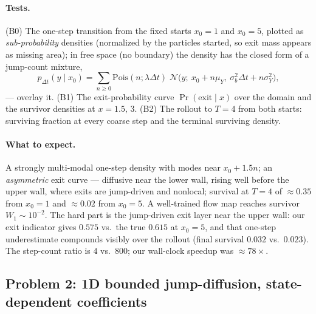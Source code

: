 \documentclass[11pt]{article}
\begin{document}
\paragraph{Tests.} (B0) The one-step transition from the fixed starts
$x_0=1$ and $x_0=5$, plotted as \emph{sub-probability} densities
(normalized by the particles started, so exit mass appears as missing
area); in free space (no boundary) the density has the closed form of a
jump-count mixture,
\begin{equation*}
p_{\Delta t}(y\mid x_0)=\sum_{n\ge0}\mathrm{Pois}(n;\lambda\Delta t)\;
\mathcal N\!\bigl(y;\ x_0+n\mu_Y,\ \sigma_b^2\Delta t+n\sigma_Y^2\bigr),
\end{equation*}
--- overlay it. (B1) The exit-probability curve
$\Pr(\text{exit}\mid x)$ over the domain and the survivor densities at
$x=1.5,\,3$. (B2) The rollout to $T=4$ from both starts: surviving
fraction at every coarse step and the terminal surviving density.

\paragraph{What to expect.} A strongly multi-modal one-step density with
modes near $x_0+1.5n$; an \emph{asymmetric} exit curve --- diffusive near
the lower wall, rising well before the upper wall, where exits are
jump-driven and nonlocal; survival at $T=4$ of $\approx0.35$ from $x_0=1$
and $\approx0.02$ from $x_0=5$. A well-trained flow map reaches survivor
$W_1\sim10^{-2}$. The hard part is the jump-driven exit layer near the
upper wall: our exit indicator gives $0.575$ vs.\ the true $0.615$ at
$x_0=5$, and that one-step underestimate compounds visibly over the
rollout (final survival $0.032$ vs.\ $0.023$). The step-count ratio is
$4$ vs.\ $800$; our wall-clock speedup was $\approx78\times$.

\subsection{Problem 2: 1D bounded jump-diffusion, state-dependent
coefficients}
\end{document}
